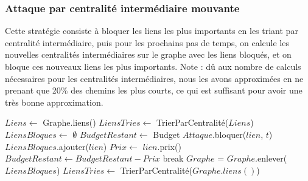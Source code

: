 \subsubsection{Attaque par centralité intermédiaire mouvante}\label{subsubsec:attaque_centralite_intermediaire_mouvante}

Cette stratégie consiste à bloquer les liens les plus importants en les triant par centralité intermédiaire, puis pour les prochains pas de temps, on calcule les nouvelles centralités intermédiaires sur le graphe avec les liens bloqués, et on bloque ces nouveaux liens les plus importants.
Note : dû aux nombre de calculs nécessaires pour les centralités intermédiaires, nous les avons approximées en ne prenant que 20\% des chemins les plus courts, ce qui est suffisant pour avoir une très bonne approximation.

\begin{algorithm}[H]
\caption{Attaque par centralité intermédiaire mouvante}
\begin{algorithmic}
\State $Liens \gets$ Graphe.liens()
\State $LiensTries \gets$ TrierParCentralité($Liens$)
\State $LiensBloques \gets$ $\emptyset$
\State $BudgetRestant \gets$ Budget
\State $Attaque$.bloquer($lien$, $t$)
\State $LiensBloques$.ajouter($lien$)
\State $Prix \gets$ $lien$.prix()
\State $BudgetRestant \gets BudgetRestant - Prix$
\State break
\EndIf
\EndFor
\State $Graphe$ = $Graphe$.enlever($LiensBloques$)
\State $LiensTries \gets$ TrierParCentralité($Graphe.liens()$)
\EndFor
\end{algorithmic}
\end{algorithm}